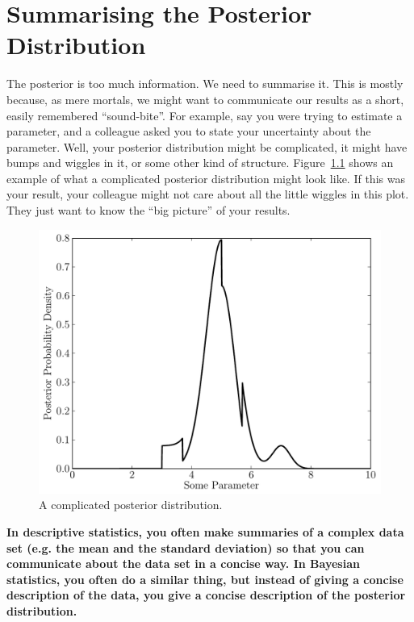 \chapter{Summarising the Posterior Distribution}
The posterior is too much information. We need to summarise it. This is mostly
because, as mere mortals, we might want to communicate our results as a short,
easily remembered ``sound-bite''. For example, say you were trying to estimate
a parameter, and a colleague asked you to state your uncertainty about the
parameter. Well, your posterior distribution might be complicated, it might
have bumps and wiggles in it, or some other kind of structure.
Figure~\ref{fig:complicated_posterior} shows an example of what a complicated
posterior distribution might look like. If this was your result, your colleague
might not care about all the little wiggles in this plot. They just want to know
the ``big picture'' of your results.
\begin{figure}[h!]
\begin{center}
\includegraphics[scale=0.6]{Figures/complicated_posterior.pdf}
\caption{A complicated posterior distribution.\label{fig:complicated_posterior}}
\end{center}
\end{figure}

\begin{framed}
{\bf In descriptive statistics, you often make summaries of a complex data set
(e.g. the mean and the standard deviation) so that you can communicate about
the data set in a concise way. In Bayesian statistics, you often do a similar
thing, but instead of giving a concise description of the data, you give a
concise description of the posterior distribution.}
\end{framed}

